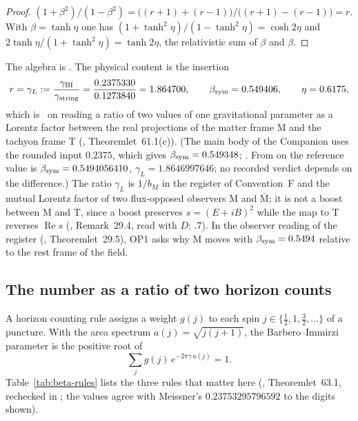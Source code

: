 \begin{proof}
$(1+\beta^2)/(1-\beta^2)=\bigl((r+1)+(r-1)\bigr)/\bigl((r+1)-(r-1)\bigr)=r$.  With $\beta=\tanh\eta$ one has
$(1+\tanh^2\eta)/(1-\tanh^2\eta)=\cosh2\eta$ and $2\tanh\eta/(1+\tanh^2\eta)=\tanh2\eta$, the relativistic sum of $\beta$ and $\beta$.
\end{proof}

The algebra is \Established.  The physical content is the insertion
\begin{equation}
 r=\gamma_L:=\frac{\gamma_{\mathrm{BI}}}{\gamma_{\mathrm{string}}}=\frac{0.2375330}{0.1273840}=1.864700,\qquad
 \beta_{\mathrm{sym}}=0.549406,\qquad \eta=0.6175,
 \label{eq:beta-values}
\end{equation}
which is \Conditional\ on reading a ratio of two values of one gravitational parameter as a Lorentz factor between the real projections of the
matter frame M and the tachyon frame T (, Theoremlet~61.1(c)).  (The main body of the Companion uses the rounded input $0.2375$, which gives $\beta_{\mathrm{sym}}=0.549348$; .  From  on the reference value is $\beta_{\mathrm{sym}}=0.5494056410$, $\gamma_L=1.8646997646$; no recorded verdict depends on the difference.)  The ratio
$\gamma_L$ is $1/b_M$ in the register of Convention~F and the mutual Lorentz factor of two flux-opposed observers M and $\bar{\mathrm M}$; it is not a
boost between M and T, since a boost preserves $s=(E+iB)^2$ while the map to T reverses $\operatorname{Re}s$ (, Remark~29.4, read with $D$; .7).  In the
observer reading of the register (, Theoremlet~29.5), OP1 asks why M moves with $\beta_{\mathrm{sym}}=0.5494$ relative to the rest frame of the field.

\subsection{The number as a ratio of two horizon counts}
\label{sec:beta-counting}

A horizon counting rule assigns a weight $g(j)$ to each spin $j\in\{\tfrac12,1,\tfrac32,\dots\}$ of a puncture.  With the area spectrum
$a(j)=\sqrt{j(j+1)}$, the Barbero--Immirzi parameter is the positive root of
\begin{equation}
 \sum_j g(j)\,e^{-2\pi\gamma\,a(j)}=1 .
 \label{eq:beta-counting}
\end{equation}
Table~\ref{tab:beta-rules} lists the three rules that matter here (, Theoremlet~63.1, rechecked in ; the values agree
with Meissner's $0.23753295796592$ to the digits shown).

